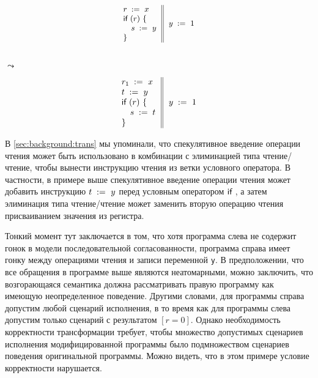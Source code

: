 \begin{minipage}{0.43\linewidth}
\begin{equation*}
\small
\inarrII{
  \readInst{}{r}{x}      \\
  \kw{if} {(r)} ~\{      \\
  \quad\readInst{}{s}{y} \\
  \}

}{
  \writeInst{}{y}{1}       \\
}
\label{ex:sliA}
\end{equation*}
\end{minipage}\hfill%
\begin{minipage}{0.09\linewidth}
\Large~\\ $\leadsto$
\end{minipage}\hfill%
\begin{minipage}{0.43\linewidth}
\begin{equation*}
\inarrII{
  \readInst{}{r_1}{x}      \\
  \readInst{}{t}{y}        \\
  \kw{if} {(r)} ~\{        \\
  \quad\assignInst{s}{t}   \\
  \}

}{
  \writeInst{}{y}{1}       \\
}
\label{ex:sliB}
\end{equation*}
\end{minipage}
 
В \cref{sec:background:trans} мы упоминали, 
что спекулятивное введение операции чтения может быть 
использовано в комбинации с элиминацией 
типа чтение/чтение, чтобы вынести инструкцию чтения
из  ветки условного оператора. 
В частности, в примере выше  
спекулятивное введение операции чтения может добавить 
инструкцию $t\;:=_{}\;y$ перед условным оператором $\textsf{if}~$, 
а затем элиминация типа чтение/чтение может заменить 
вторую операцию чтения присваиванием значения из регистра. 

Тонкий момент тут заключается в том, что хотя 
программа слева не содержит гонок в модели 
последовательной согласованности, 
программа справа имеет гонку между 
операциями чтения и записи переменной \texttt{y}.
В предположении, что все 
обращения в программе выше являются неатомарными, 
можно заключить, что возгорающаяся семантика 
должна рассматривать правую программу как 
имеющую неопределенное поведение. 
Другими словами, для программы справа 
допустим любой сценарий исполнения, 
в то время как для программы слева 
допустим только сценарий с результатом ${[r=0]}$.
Однако необходимость корректности трансформации требует, 
чтобы множество допустимых сценариев исполнения 
модифицированной программы было подмножеством 
сценариев поведения оригинальной программы. 
Можно видеть, что в этом примере условие корректности нарушается. 

